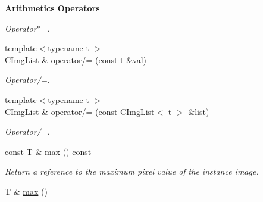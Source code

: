 \begin{Indent}{\bf Arithmetics Operators}
\begin{DoxyCompactItemize}
\begin{DoxyCompactList}\small\item\em Operator$\ast$=. \end{DoxyCompactList}\item 
\hypertarget{structcimg__library_1_1_c_img_list_a5602832502c66b3f6e6a7b77ec383715}{{\footnotesize template$<$typename t $>$ }\\\hyperlink{structcimg__library_1_1_c_img_list}{C\-Img\-List} \& \hyperlink{structcimg__library_1_1_c_img_list_a5602832502c66b3f6e6a7b77ec383715}{operator/=} (const t \&val)}\label{structcimg__library_1_1_c_img_list_a5602832502c66b3f6e6a7b77ec383715}

\begin{DoxyCompactList}\small\item\em Operator/=. \end{DoxyCompactList}\item 
\hypertarget{structcimg__library_1_1_c_img_list_ac8b5e84624149bf7b07a3f69c8e75c9f}{{\footnotesize template$<$typename t $>$ }\\\hyperlink{structcimg__library_1_1_c_img_list}{C\-Img\-List} \& \hyperlink{structcimg__library_1_1_c_img_list_ac8b5e84624149bf7b07a3f69c8e75c9f}{operator/=} (const \hyperlink{structcimg__library_1_1_c_img_list}{C\-Img\-List}$<$ t $>$ \&list)}\label{structcimg__library_1_1_c_img_list_ac8b5e84624149bf7b07a3f69c8e75c9f}

\begin{DoxyCompactList}\small\item\em Operator/=. \end{DoxyCompactList}\item 
\hypertarget{structcimg__library_1_1_c_img_list_a3ddf4bf5d3c7a8304c6614c37d1c9dc0}{const T \& \hyperlink{structcimg__library_1_1_c_img_list_a3ddf4bf5d3c7a8304c6614c37d1c9dc0}{max} () const }\label{structcimg__library_1_1_c_img_list_a3ddf4bf5d3c7a8304c6614c37d1c9dc0}

\begin{DoxyCompactList}\small\item\em Return a reference to the maximum pixel value of the instance image. \end{DoxyCompactList}\item 
\hypertarget{structcimg__library_1_1_c_img_list_acad5358b2fef3e093470929490ea6361}{T \& \hyperlink{structcimg__library_1_1_c_img_list_acad5358b2fef3e093470929490ea6361}{max} ()}\label{structcimg__library_1_1_c_img_list_acad5358b2fef3e093470929490ea6361}


\end{DoxyCompactItemize}
\end{Indent}
